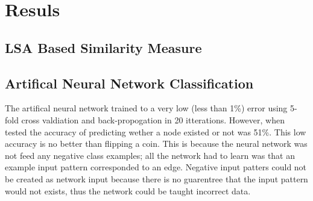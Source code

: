 \section{Resuls}
\label{sec:Results}

\subsection{LSA Based Similarity Measure}

\subsection{Artifical Neural Network Classification}

The artifical neural network trained to a very low (less than 1\%) error using 5-fold cross valdiation and back-propogation in 20 itterations. 
However, when tested the accuracy of predicting wether a node existed or not was 51\%.  This low accuracy is no better than flipping a coin.
This is because the neural network was not feed any negative class examples; all the network had to learn was that an example input pattern corresponded to an edge.
Negative input patters could not be created as network input because there is no guarentree that the input pattern would not exists, thus the network could be taught incorrect data.

